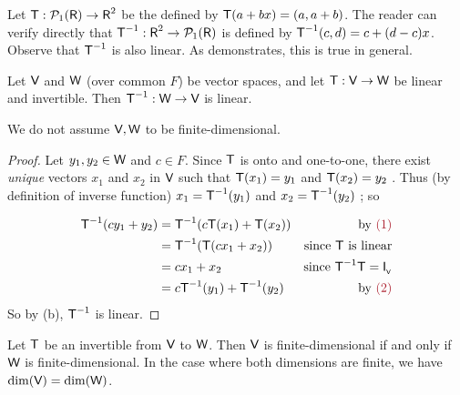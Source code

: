 \begin{example} \label{example 2.4.1}
Let \(\textsf{T} : \mathcal{P}_1(\textsf{R}) \to \textsf{R}^2\) be the \LTRAN{} defined by \(\textsf{T}(a + bx) = (a, a + b)\).
The reader can verify directly that \(\textsf{T}^{-1} : \textsf{R}^2 \to \mathcal{P}_1(\textsf{R})\) is defined by \(\textsf{T}^{-1}(c, d) = c + (d - c)x\).
Observe that \(\textsf{T}^{-1}\) is also linear.
As  demonstrates, this is true in general.
\end{example}

\begin{theorem} \label{thm 2.17}
Let \(\textsf{V}\) and \(\textsf{W}\) (over common \(F\)) be vector spaces, and let \(\textsf{T} : \textsf{V} \to \textsf{W}\) be linear and invertible.
Then \(\textsf{T}^{-1} : \textsf{W} \to \textsf{V}\) is linear.
\end{theorem}

\begin{note}
We do not assume \(\textsf{V}, \textsf{W}\) to be finite-dimensional.
\end{note}

\begin{proof}
Let \(y_1, y_2 \in \textsf{W}\) and \(c \in F\).
Since \(\textsf{T}\) is onto and one-to-one, there exist \emph{unique} vectors \(x_1\) and \(x_2\) in \(\textsf{V}\) such that \(\textsf{T}(x_1) = y_1\) and \(\textsf{T}(x_2) = y_2\) .
Thus (by definition of inverse function) \(x_1 = \textsf{T}^{-1}(y_1)\) and \(x_2 = \textsf{T}^{-1}(y_2)\) ; so

\begin{align*}
    \T^{-1}(cy_1 + y_2) & = \T^{-1}(c\T(x_1) + \T(x_2)) & \text{by \MAROON{(1)}} \\
                        & = \T^{-1}(\T(cx_1 + x_2)) & \text{since \(\T\) is linear} \\
                        & = cx_1 + x_2 & \text{since \(\T^{-1}\T = \ITRANV\)} \\
                        & = c\T^{-1}(y_1) + \T^{-1}(y_2) & \text{by \MAROON{(2)}}
\end{align*}
So by (b), \(\textsf{T}^{-1}\) is linear.
\end{proof}

\begin{corollary} \label{corollary 2.17.1}
Let \(\textsf{T}\) be an invertible \LTRAN{} from \(\textsf{V}\) to \(\textsf{W}\).
Then \(\textsf{V}\) is finite-dimensional if and only if \(\textsf{W}\) is finite-dimensional.
In the case where both dimensions are finite, we have \(\dim(\textsf{V}) = \dim(\textsf{W})\).
\end{corollary}

